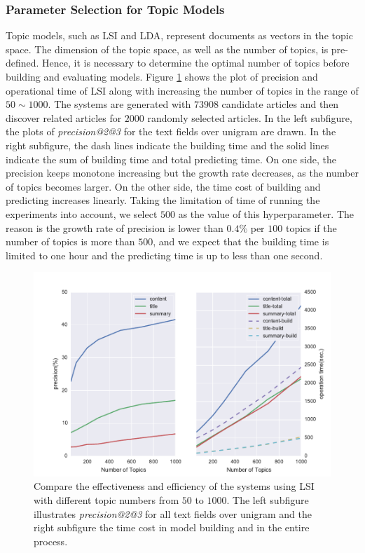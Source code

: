 \subsubsection{Parameter Selection for Topic Models}

Topic models, such as LSI and LDA, represent documents as vectors in the topic space. The dimension of the topic space, as well as the number of topics, is pre-defined. Hence, it is necessary to determine the optimal number of topics before building and evaluating models. Figure \ref{fig:precision_topics} shows the plot of precision and operational time of LSI along with increasing the number of topics in the range of $50 \sim 1000$. The systems are generated with $73908$ candidate articles and then discover related articles for $2000$ randomly selected articles. In the left subfigure, the plots of \textit{precision@2@3} for the text fields over unigram are drawn. In the right subfigure, the dash lines indicate the building time and the solid lines indicate the sum of building time and total predicting time. On one side, the precision keeps monotone increasing  but the growth rate decreases, as the number of topics becomes larger. On the other side, the time cost of building and predicting increases linearly. Taking the limitation of time of running the experiments into account, we select $500$ as the value of this hyperparameter. The reason is the growth rate of precision is lower than $0.4\%$ per $100$ topics if the number of topics is more than $500$, and we expect that the building time is limited to one hour and the predicting time is up to less than one second. 

\clearpage

\begin{figure}[!htb]
    \centering
    \includegraphics[width=\textwidth]{fig/precision_topics}
    \caption[Compare the effectiveness and efficiency of the systems using LSI with different topic numbers from $50$ to $1000$.]{Compare the effectiveness and efficiency of the systems using LSI with different topic numbers from $50$ to $1000$. The left subfigure illustrates  \textit{precision@2@3} for all text fields over unigram and the right subfigure the time cost in model building and in the entire process. }
    \label{fig:precision_topics}
\end{figure}

